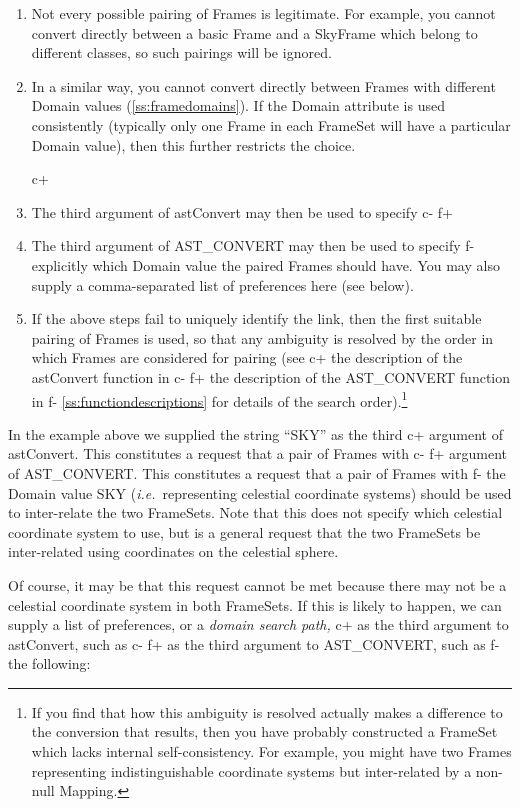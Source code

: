 \documentclass[twoside,11pt]{article}
\newcommand{\appref}[1]{Appendix~\ref{#1}}
\newcommand{\secref}[1]{\S\ref{#1}}
\renewcommand{\appref}[1]{\ref{#1}}
\renewcommand{\secref}[1]{\ref{#1}}
\begin{document}
\begin{enumerate}
\item Not every possible pairing of Frames is legitimate. For example,
you cannot convert directly between a basic Frame and a SkyFrame which
belong to different classes, so such pairings will be ignored.

\item In a similar way, you cannot convert directly between Frames
with different Domain values (\secref{ss:framedomains}). If the Domain
attribute is used consistently (typically only one Frame in each
FrameSet will have a particular Domain value), then this further
restricts the choice.

c+
\item The third argument of astConvert may then be used to specify
c-
f+
\item The third argument of AST\_CONVERT may then be used to specify
f-
explicitly which Domain value the paired Frames should have. You may
also supply a comma-separated list of preferences here (see below).

\item If the above steps fail to uniquely identify the link, then the
first suitable pairing of Frames is used, so that any ambiguity is
resolved by the order in which Frames are considered for pairing (see
c+
the description of the astConvert function in
c-
f+
the description of the AST\_CONVERT function in
f-
\appref{ss:functiondescriptions} for details of the search
order).\footnote{If you find that how this ambiguity is resolved
actually makes a difference to the conversion that results, then you
have probably constructed a FrameSet which lacks internal
self-consistency. For example, you might have two Frames representing
indistinguishable coordinate systems but inter-related by a non-null
Mapping.}
\end{enumerate}

In the example above we supplied the string ``SKY'' as the third
c+
argument of astConvert. This constitutes a request that a pair of
Frames with
c-
f+
argument of AST\_CONVERT. This constitutes a request that a pair of
Frames with
f-
the Domain value SKY ({\em{i.e.}}\ representing celestial coordinate
systems) should be used to inter-relate the two FrameSets. Note that
this does not specify which celestial coordinate system to use, but is
a general request that the two FrameSets be inter-related using
coordinates on the celestial sphere.

Of course, it may be that this request cannot be met because there may
not be a celestial coordinate system in both FrameSets. If this is
likely to happen, we can supply a list of preferences, or a
{\em{domain search path,}}
c+
as the third argument to astConvert, such as
c-
f+
as the third argument to AST\_CONVERT, such as
f-
the following:
\end{document}
